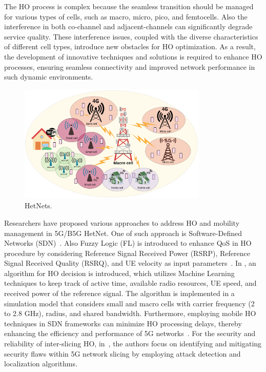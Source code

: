\documentclass[graybox]{svmult}
\begin{document}
The HO process is complex because the seamless transition should be managed for  various types of cells, such as macro, micro, pico, and femtocells. Also the interference in both co-channel and adjacent-channels can significantly degrade service quality. These interference issues, coupled with the diverse characteristics of different cell types, introduce new obstacles for HO optimization. As a result, the development of innovative techniques and solutions is required to enhance HO processes, ensuring seamless connectivity and improved network performance in such dynamic environments.

\begin{figure}[h]\centering
	\includegraphics[width=0.8\textwidth]{figure/hetnets.png}
	\caption{HetNets.}\label{fig:hetnets}
\end{figure}

Researchers have proposed various approaches to address HO and mobility management in 5G/B5G HetNet. One of such approach is Software-Defined Networks (SDN)~\cite{7108393}. Also Fuzzy Logic (FL) is introduced to enhance QoS in HO procedure by considering Reference Signal Received Power (RSRP), Reference Signal Received Quality (RSRQ), and UE velocity as input parameters~\cite{alraih2022robust}. In \cite{khan2021improved}, an algorithm for HO decision is introduced, which utilizes Machine Learning techniques to keep track of active time, available radio resources, UE speed, and received power of the reference signal. The algorithm is implemented in a simulation model that considers small and macro cells with carrier frequency (2 to 2.8 GHz), radius, and shared bandwidth. Furthermore, employing mobile HO techniques in SDN frameworks can minimize HO processing delays, thereby enhancing the efficiency and performance of 5G networks~\cite{8587956,7993880,8748678}. For the security and reliability of inter-slicing HO, in~\cite{10060402}, the authors focus on identifying and mitigating security flaws within 5G network slicing by employing attack detection and localization algorithms. 
\end{document}
